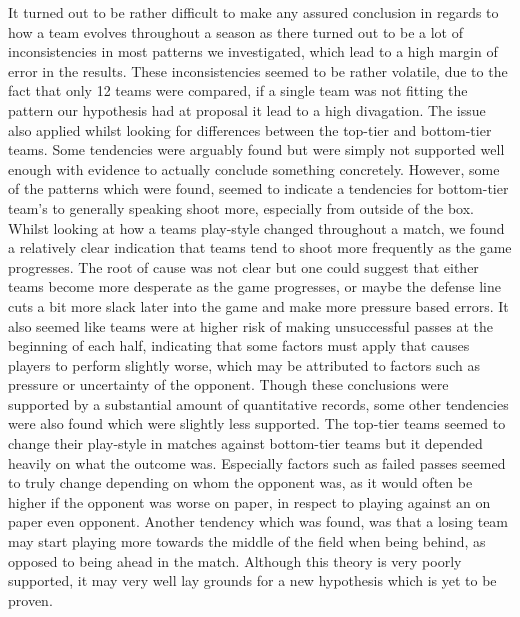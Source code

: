 \documentclass[11pt]{article}
\begin{document}
 



It turned out to be rather difficult to make any assured conclusion in regards to how a team evolves throughout a season as there turned out to be a lot of inconsistencies in most patterns we investigated, which lead to a high margin of error in the results. These inconsistencies seemed to be rather volatile, due to the fact that only 12 teams were compared, if a single team was not fitting the pattern our hypothesis had at proposal it lead to a high divagation. The issue also applied whilst looking for differences between the top-tier and bottom-tier teams. Some tendencies were arguably found but were simply not supported well enough with evidence to actually conclude something concretely. However, some of the patterns which were found, seemed to indicate a tendencies for bottom-tier team's to generally speaking shoot more, especially from outside of the box. Whilst looking at how a teams play-style changed throughout a match, we found a relatively clear indication that teams tend to shoot more frequently as the game progresses. The root of cause was not clear but one could suggest that either teams become more desperate as the game progresses, or maybe the defense line cuts a bit more slack later into the game and make more pressure based errors. It also seemed like teams were at higher risk of making unsuccessful passes at the beginning of each half, indicating that some factors must apply that causes players to perform slightly worse, which may be attributed to factors such as pressure or uncertainty of the opponent. Though these conclusions were supported by a substantial amount of quantitative records, some other tendencies were also found which were slightly less supported. The top-tier teams seemed to change their play-style in matches against bottom-tier teams but it depended heavily on what the outcome was. Especially factors such as failed passes seemed to truly change depending on whom the opponent was, as it would often be higher if the opponent was worse on paper, in respect to playing against an on paper even opponent. Another tendency which was found, was that a losing team may start playing more towards the middle of the field when being behind, as opposed to being ahead in the match. Although this theory is very poorly supported, it may very well lay grounds for a new hypothesis which is yet to be proven.
\end{document}

